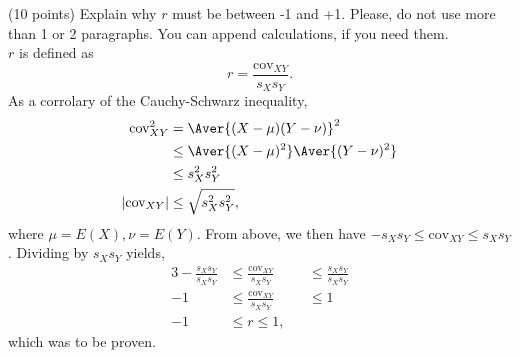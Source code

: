 \documentclass[onecolumn,10pt]{jhwhw}
\begin{document}
\clearpage
\problem{}
(10 points) Explain why $r$ must be between -1 and +1. Please, do not use more than 1 or 2 paragraphs. You can append calculations, if you need them.\\

\noindent $r$ is defined as
$$r = \frac{\mbox{cov}_{XY}}{s_X s_Y}.$$
As a corrolary of the Cauchy-Schwarz inequality,
\begin{align*}
\mbox{cov}_{XY}^2 & = \Aver{(X-\mu)(Y-\nu)}^2           \\
                    & \leq \Aver{(X-\mu)^2}\Aver{(Y-\nu)^2}        \\
                    & \leq s_X^2 s_Y^2 \\
|\mbox{cov}_{XY}|   & \leq \sqrt{s_X^2 s_Y^2},
\end{align*}
where $\mu=E(X), \nu=E(Y)$. From above, we then have $-s_X s_Y \leq \mbox{cov}_{XY} \leq s_X s_Y$. Dividing by $s_X s_Y$ yields,
\begin{alignat*}{3}
-\frac{s_X s_Y}{s_X s_Y} & \leq \frac{\mbox{cov}_{XY}}{s_X s_Y} && \leq \frac{s_X s_Y}{s_X s_Y} \\
-1 & \leq \frac{\mbox{cov}_{XY}}{s_X s_Y} && \leq 1 \\
-1 & \leq r \leq 1,
\end{alignat*}
which was to be proven.
\end{document}
